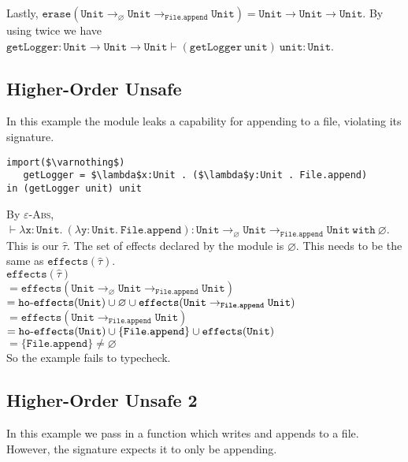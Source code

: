 \documentclass{llncs}
\newcommand{\keywadj}[1]{\mathtt{#1}}
\newcommand{\keyw}[1]{\keywadj{#1}~}
\newcommand{\kw}[1]{\keyw{ #1 }}
\newcommand{\kwa}[1]{\keywadj{ #1 }}
\newcommand{\hyphen}{\hbox{-}}
\begin{document}
\noindent
Lastly, $\kwa{erase(Unit \rightarrow_{\varnothing} Unit \rightarrow_{File.append} Unit) = Unit \rightarrow Unit \rightarrow Unit}$. By using  twice we have \\ $\kwa{getLogger: Unit \rightarrow Unit \rightarrow Unit \vdash (getLogger~unit)~unit: Unit}$.\\

\subsection{Higher-Order Unsafe}

In this example the module leaks a capability for appending to a file, violating its signature.

\begin{lstlisting}
import($\varnothing$)
   getLogger = $\lambda$x:Unit . ($\lambda$y:Unit . File.append)
in (getLogger unit) unit
\end{lstlisting}

\noindent
By \textsc{$\varepsilon$-Abs}, $\kwa{\vdash \lambda x:Unit.~(\lambda y:Unit.~File.append): Unit \rightarrow_{\varnothing} Unit \rightarrow_{File.append} Unit}~\kw{with} \varnothing$. This is our $\hat \tau$. The set of effects declared by the module is $\varnothing$. This needs to be the same as $\kwa{effects}(\hat \tau)$. \\

\noindent
$\kwa{effects}(\hat \tau)$ \\
$= \kwa{effects}(\kwa{Unit \rightarrow_{\varnothing} Unit \rightarrow_{File.append} Unit})$ \\
$ = \kwa{ho \hyphen effects(Unit) \cup \varnothing \cup \kwa{effects}(Unit \rightarrow_{File.append} Unit)}$ \\
$ = \kwa{effects(Unit \rightarrow_{File.append} Unit)}$ \\
$ = \kwa{ho \hyphen effects(Unit) \cup \{ File.append \} \cup effects(Unit)}$ \\
$ = \{ \kwa{File.append} \} \neq \varnothing$\\

\noindent
So the example fails to typecheck.


\subsection{Higher-Order Unsafe 2}

In this example we pass in a function which writes and appends to a file. However, the signature expects it to only be appending.
\end{document}
